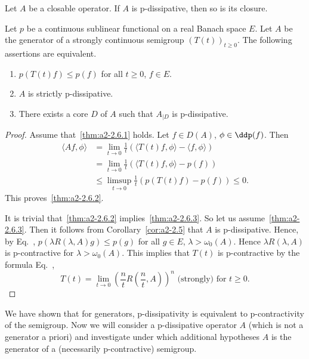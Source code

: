 \begin{corollary}\label{cor:a2-2.5}
Let $A$ be a closable operator.
If\/ $A$ is p-dissipative, then so is its closure.
\end{corollary}
\begin{theorem}\label{thm:a2-2.6}
Let $p$ be a continuous sublinear functional on a real Banach space $E$.
Let $A$ be the generator of a strongly continuous semigroup $(T(t))_{t\geq 0}$.
The following assertions are equivalent.

\begin{enumerate}[\upshape (a)]
\item \label{thm:a2-2.6.1}
$p(T(t)f) \leq p(f)$ for all $t \geq 0$, $f \in E$.

\item \label{thm:a2-2.6.2}
$A$ is strictly p-dissipative.
 
\item \label{thm:a2-2.6.3}
There exists a core $D$ of\/ $A$ such that $A_{\vert D}$ is p-dissipative.
\end{enumerate}
\end{theorem}
\begin{proof}
Assume that~\ref{thm:a2-2.6.1} holds.
Let $f \in D(A)$, $\phi \in \ddp(f)$.
Then 
\begin{align*}
	\langle Af,\phi \rangle &= \lim_{t\to 0} \frac{1}{t} (\langle T(t)f,\phi \rangle - \langle f,\phi \rangle) \\
	&= \lim_{t\to 0} \frac{1}{t} (\langle T(t)f,\phi \rangle - p(f)) \\
	&\leq \limsup_{t\to 0} \frac{1}{t} (p(T(t)f) - p(f)) \leq 0. 
\end{align*}
This proves~\ref{thm:a2-2.6.2}. 

It is trivial that~\ref{thm:a2-2.6.2} implies~\ref{thm:a2-2.6.3}.  
So let us assume~\ref{thm:a2-2.6.3}. 
Then it follows from Corollary~\ref{cor:a2-2.5}   that $A$ is p-dissipative.
Hence, by Eq.~,  $p(\lambda R(\lambda,A)g) \leq p(g)$ for all $g \in E$, $\lambda > \omega_{0}(A)$.
Hence $\lambda R(\lambda,A)$ is p-contractive for $\lambda > \omega_{0}(A)$.
This implies that $T(t)$ is p-contractive by the formula Eq.~, 
\[
T(t) = \lim_{t\to 0} \left( \frac{n}{t} R\left( \frac{n}{t},A \right) \right)^{n} \text{ (strongly) for } t \geq 0.
\]
\end{proof}
We have shown that for generators, p-dissipativity is equivalent to p-contractivity of the semigroup.
Now we will consider a p-dissipative operator $A$ (which is not a generator a priori) and investigate under which additional hypotheses $A$ is the generator of a (necessarily p-contractive) semigroup.
